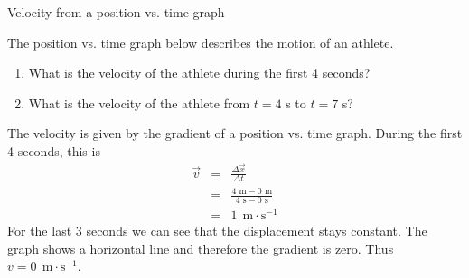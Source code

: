 \begin{wex}{Velocity from a position vs. time graph}{The position vs. time graph below describes the motion of an athlete.\\
\begin{center}
\end{center}\begin{enumerate}[label=\textbf{\arabic*}.]
\item What is the velocity of the athlete during the first 4 seconds?
\item What is the velocity of the athlete from $t=4$ s to $t=7$ s?
\end{enumerate}}
{
The velocity is given by the gradient of a position vs. time graph. During the first 4 seconds, this is
\begin{eqnarray*}
\vec{v}&=&\frac{\Delta \vec{x}}{\Delta t}\\
&=&\frac{4\text{~m} - 0\text{~m}}{4\text{~s} - 0\text{~s}}\\
&=&1\ ~\text{m}\cdot \text{s}^{-1}
\end{eqnarray*}
For the last 3 seconds we can see that the displacement stays constant. The graph shows a horizontal line and therefore the gradient is zero. Thus ${v}=0\ ~\text{m}\cdot \text{s}^{-1}$.}
\end{wex} 
    \noindent 
